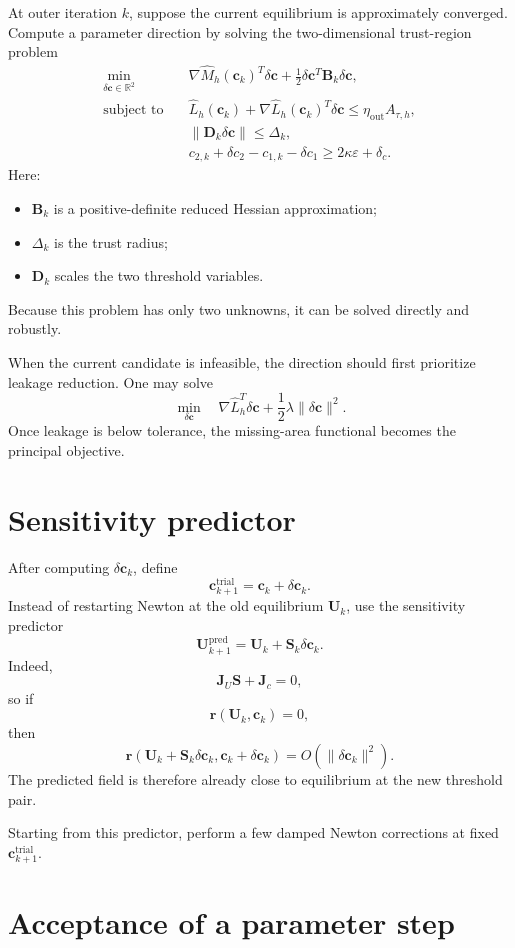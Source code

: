 \documentclass[11pt]{article}
\newcommand{\R}{\mathbb{R}}
\newcommand{\bU}{\mathbf{U}}
\newcommand{\bc}{\mathbf{c}}
\newcommand{\br}{\mathbf{r}}
\newcommand{\bJ}{\mathbf{J}}
\newcommand{\bS}{\mathbf{S}}
\begin{document}
At outer iteration $k$, suppose the current equilibrium is approximately converged. Compute a parameter direction by solving the two-dimensional trust-region problem
\[
\begin{aligned}
\min_{\delta\bc\in\R^2}\quad&
\nabla\widehat M_h(\bc_k)^T\delta\bc
+
\frac12
\delta\bc^T\mathbf{B}_k\delta\bc,
\\
\text{subject to}\quad&
\widehat L_h(\bc_k)
+
\nabla\widehat L_h(\bc_k)^T\delta\bc
\leq
\eta_{\mathrm{out}}A_{\tau,h},
\\
&
\|\mathbf{D}_k\delta\bc\|
\leq
\Delta_k,
\\
&
c_{2,k}+\delta c_2
-
c_{1,k}-\delta c_1
\geq
2\kappa\varepsilon+\delta_c.
\end{aligned}
\]
Here:
\begin{itemize}[leftmargin=2em]
\item $\mathbf{B}_k$ is a positive-definite reduced Hessian approximation;
\item $\Delta_k$ is the trust radius;
\item $\mathbf{D}_k$ scales the two threshold variables.
\end{itemize}
Because this problem has only two unknowns, it can be solved directly and robustly.

When the current candidate is infeasible, the direction should first prioritize leakage reduction. One may solve
\[
\min_{\delta\bc}
\quad
\nabla\widehat L_h^T\delta\bc
+
\frac12\lambda\|\delta\bc\|^2.
\]
Once leakage is below tolerance, the missing-area functional becomes the principal objective.

\section{Sensitivity predictor}

After computing $\delta\bc_k$, define
\[
\bc_{k+1}^{\mathrm{trial}}
=
\bc_k+\delta\bc_k.
\]
Instead of restarting Newton at the old equilibrium $\bU_k$, use the sensitivity predictor
\[
\boxed{
\bU_{k+1}^{\mathrm{pred}}
=
\bU_k+\bS_k\delta\bc_k.
}
\]
Indeed,
\[
\bJ_U\bS+\bJ_c=0,
\]
so if
\[
\br(\bU_k,\bc_k)=0,
\]
then
\[
\br\left(
\bU_k+\bS_k\delta\bc_k,
\bc_k+\delta\bc_k
\right)
=
O(\|\delta\bc_k\|^2).
\]
The predicted field is therefore already close to equilibrium at the new threshold pair.

Starting from this predictor, perform a few damped Newton corrections at fixed $\bc_{k+1}^{\mathrm{trial}}$.

\section{Acceptance of a parameter step}
\end{document}
